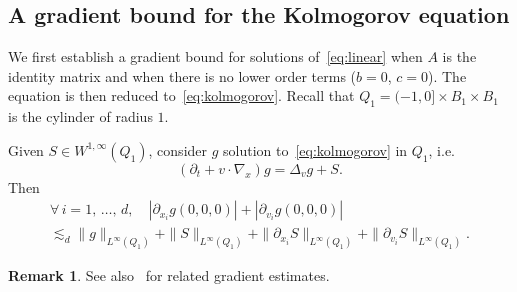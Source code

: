 \documentclass[10pt]{amsart}
\theoremstyle{definition}\newtheorem{defi}[theo]{Definition}\newtheorem{rema}[theo]{Remark}\newtheorem{exam}[theo]{Example}\newtheorem{exem}[theo]{Example}\newtheorem{nota}[theo]{Notation}
\let\oldforall\forall
\renewcommand*{\forall}{\mathrel{\oldforall}}
\begin{document}
\subsection{A gradient bound for the Kolmogorov equation}

We first establish a gradient bound for solutions of~\eqref{eq:linear} when $A$ is the identity matrix and when there is no lower order terms ($b=0$, $c=0$). The equation is then reduced to~\eqref{eq:kolmogorov}. Recall that $Q_1= (-1,0] \times B_1 \times B_1$ is the cylinder of radius $1$.

\begin{prop}\label{prop:grad}
Given $S \in W^{1,\infty} (Q_1)$, consider $g$ solution to~\eqref{eq:kolmogorov} in $Q_1$, i.e.
\[
(\partial_t + v \cdot \nabla_x)g = \Delta_v g + S.
\]
Then
\begin{multline*}
\forall \, i =1,\,\dots,\,d, \quad \left|\partial_{x_i} g(0,0,0)\right| + |\partial_{v_i} g(0,0,0)| \\
\lesssim_{d}\|g\|_{L^\infty(Q_1)}+\|S\|_{L^\infty(Q_1)} +\|\partial_{x_i} S\|_{L^\infty(Q_1)}+\|\partial_{v_i} S\|_{L^\infty(Q_1)}.
\end{multline*}
\end{prop}

\begin{rema}
See also~\cite{baudoin2017,guillin2012} for related gradient estimates.
\end{rema}
\end{document}
